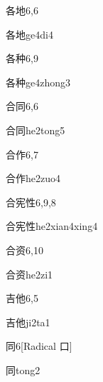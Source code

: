 \begin{entry}{各地}{6,6}
  \begin{phonetics}{各地}{ge4di4}
  \end{phonetics}
\end{entry}

\begin{entry}{各种}{6,9}
  \begin{phonetics}{各种}{ge4zhong3}
  \end{phonetics}
\end{entry}

\begin{entry}{合同}{6,6}
  \begin{phonetics}{合同}{he2tong5}
  \end{phonetics}
\end{entry}

\begin{entry}{合作}{6,7}
  \begin{phonetics}{合作}{he2zuo4}
  \end{phonetics}
\end{entry}

\begin{entry}{合宪性}{6,9,8}
  \begin{phonetics}{合宪性}{he2xian4xing4}
  \end{phonetics}
\end{entry}

\begin{entry}{合资}{6,10}
  \begin{phonetics}{合资}{he2zi1}
  \end{phonetics}
\end{entry}

\begin{entry}{吉他}{6,5}
  \begin{phonetics}{吉他}{ji2ta1}
  \end{phonetics}
\end{entry}

\begin{entry}{同}{6}[Radical 口]
  \begin{phonetics}{同}{tong2}
  \end{phonetics}
\end{entry}

